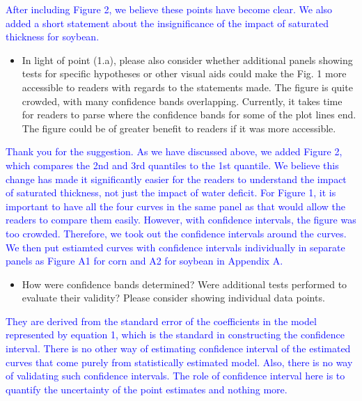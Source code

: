 \documentclass[
]{article}
\providecommand{\tightlist}{%
  \setlength{\itemsep}{0pt}\setlength{\parskip}{0pt}}
\begin{document}
\textcolor{blue}{After including Figure 2, we believe these points have become clear. We also added a short statement about the insignificance of the impact of saturated thickness for soybean.}

\begin{itemize}
\tightlist
\item
  In light of point (1.a), please also consider whether additional
  panels showing tests for specific hypotheses or other visual aids
  could make the Fig. 1 more accessible to readers with regards to the
  statements made. The figure is quite crowded, with many confidence
  bands overlapping. Currently, it takes time for readers to parse where
  the confidence bands for some of the plot lines end. The figure could
  be of greater benefit to readers if it was more accessible.
\end{itemize}

\textcolor{blue}{Thank you for the suggestion. As we have discussed above, we added Figure 2, which compares the 2nd and 3rd quantiles to the 1st quantile. We believe this change has made it significantly easier for the readers to understand the impact of saturated thickness, not just the impact of water deficit. For Figure 1, it is important to have all the four curves in the same panel as that would allow the readers to compare them easily. However, with confidence intervals, the figure was too crowded. Therefore, we took out the confidence intervals around the curves. We then put estiamted curves with confidence intervals individually in separate panels as Figure A1 for corn and A2 for soybean in Appendix A.}

\begin{itemize}
\tightlist
\item
  How were confidence bands determined? Were additional tests performed
  to evaluate their validity? Please consider showing individual data
  points.
\end{itemize}

\textcolor{blue}{They are derived from the standard error of the coefficients in the model represented by equation 1, which is the standard in constructing the confidence interval. There is no other way of estimating confidence interval of the estimated curves that come purely from statistically estimated model. Also, there is no way of validating such confidence intervals. The role of confidence interval here is to quantify the uncertainty of the point estimates and nothing more.}
\end{document}
